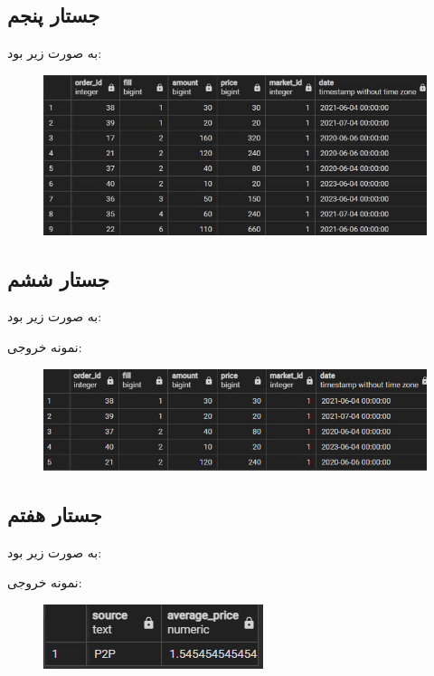 \documentclass{book}
\begin{document}
\subsection{جستار پنجم}

به صورت زیر بود:

\begin{latin}
    \footnotesize

\end{latin}

\begin{figure}[h]
    \centering
    \includegraphics[width=0.6\linewidth]{sql-res/5.jpg}
\end{figure}


\subsection{جستار ششم}

به صورت زیر بود:

\begin{latin}
    \footnotesize

\end{latin}


نمونه خروجی:

\begin{figure}[h]
    \centering
    \includegraphics[width=0.6\linewidth]{sql-res/6.jpg}
\end{figure}
\newpage


\subsection{جستار هفتم}

به صورت زیر بود:

\begin{latin}
    \footnotesize

\end{latin}

نمونه خروجی:

\begin{figure}[h]
    \centering
    \includegraphics[width=\linewidth]{sql-res/7.png}
\end{figure}
\end{document}
